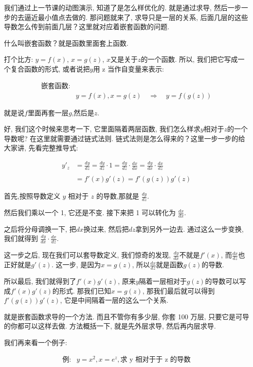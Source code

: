我们通过上一节课的动图演示, 知道了是怎么样优化的. 就是通过求导, 然后一步一步的去逼近最小值点去做的. 那问题就来了, 求导只是一层的关系, 后面几层的这些导数怎么传到前面几层？这里就对应着嵌套函数的问题. 

什么叫嵌套函数？就是函数里面套上函数. 

打个比方: $y=f(x)$, $x=g(z)$, $x$又是关于$z$的一个函数. 所以, 我们把它写成一个复合函数的形式, 或者说把$y$用 z 当作自变量来表示:

\begin{align*}
  \mbox{嵌套函数:}& \\
  & y = f(x), x = g(z) \quad \Rightarrow \quad y = f(g(z))
\end{align*}

就是说$f$里面再套一层$g$,然后是$z$. 

好, 我们这个时候来思考一下, 它里面隔着两层函数, 我们怎么样求$y$相对于$z$的一个导数呢? 在这里就需要通过链式法则. 链式法则是怎么得来的？这里一步一步的给大家讲, 先看完整推导式:

\begin{align*}
  y'_z & = \frac{dy}{dz} = \frac{dy}{dz} \cdot 1 = \frac{dy}{dz} \cdot \frac{dx}{dx} = \frac{dy}{dx} \cdot \frac{dx}{dz} \\ \\
  & = f'(x)g'(z) = f'(g(z))g'(z)
\end{align*}

首先,按照导数定义 $y$ 相对于 $z$ 的导数,那就是 $\frac{dy}{dz}$.

然后我们乘以一个 1, 它还是不变. 接下来把 1 可以转化为 $\frac{dx}{dx}$. 

之后将分母调换一下, 把$dx$换过来, 然后把$dz$拿到另外一边去. 通过这么一步变换, 我们就得到 $\frac{dy}{dx} \cdot \frac{dx}{dz}$. 

这一步之后, 现在我们可以套导数定义, 我们惊奇的发现, $\frac{dy}{dx}$不就是$f'(x)$, 而$\frac{dx}{dz}$也正好就是$g'(z)$. 这一步, 是因为$x=g(z)$, 所以$\frac{dx}{dz}$就是函数$g(z)$的导数. 

所以最后, 我们就得到了$f'(x)g'(z)$, 原来$y$隔着一层相对于$g(z)$的导数可以写成$f'(x)g'(z)$的形式. 那我们已知$x=g(z)$,  那我们最后就可以得到$f'(g(z))g'(z)$, 它是中间隔着一层的这么一个关系. 

就是嵌套函数求导的一个方法. 而且不管你有多少层, 你套 100 万层, 只要它是可导的你都可以这样去做. 方法概括一下, 就是先外层求导, 然后再内层求导. 

我们再来看一个例子:

\begin{align*}
  \mbox{例}:& y = x^2, x=e^z, \mbox{求 y 相对于于 z 的导数} \\
\end{align*}

